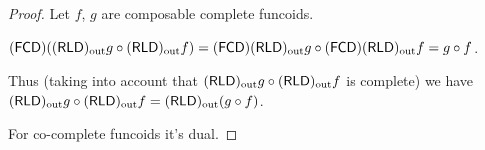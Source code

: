 \begin{proof}
Let $f$, $g$ are composable complete funcoids.

$\tofcd(\torldout g\circ\torldout f)=\tofcd\torldout g\circ\tofcd\torldout f=g\circ f$.

Thus (taking into account that $\torldout g\circ\torldout f$ is complete)
we have $\torldout g\circ\torldout f=\torldout(g\circ f)$.

For co-complete funcoids it's dual.\end{proof}

